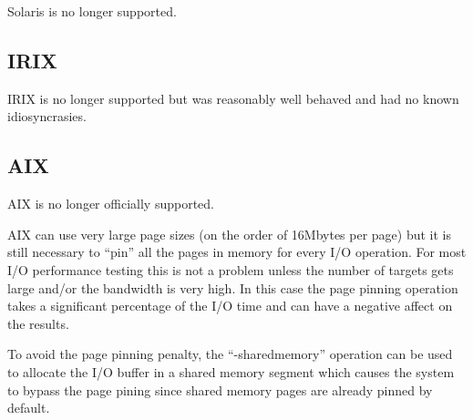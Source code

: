 Solaris is no longer supported.

\subsection{IRIX}\label{irix}

IRIX is no longer supported but was reasonably well behaved and had no known idiosyncrasies.

\subsection{\texorpdfstring{AIX }{AIX }}\label{aix-1}

AIX is no longer officially supported.

AIX can use very large page sizes (on the order of 16Mbytes per page) but it is still necessary to ``pin'' all the pages in memory for every I/O operation. For most I/O performance testing this is not a problem unless the number of targets gets large and/or the bandwidth is very high. In this case the page pinning operation takes a significant percentage of the I/O time and can have a negative affect on the results.

To avoid the page pinning penalty, the ``-sharedmemory'' operation can be used to allocate the I/O buffer in a shared memory segment which causes the system to bypass the page pining since shared memory pages are already pinned by default.

